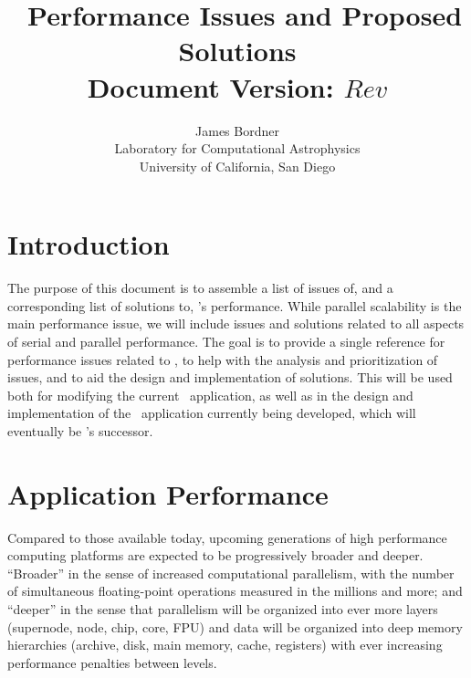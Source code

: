 \documentclass{article}
\begin{document}
\title{ {\huge \enzo\ Performance Issues and Proposed Solutions}  \\ \vspace{0.1in}
     \vspace{-0.1in} {\small Document Version: $Rev$ }}
\author{ James Bordner \\
        Laboratory for Computational Astrophysics\\
        University of California, San Diego}
\maketitle

\section{Introduction}

The purpose of this document is to assemble a list of issues of, and a
corresponding list of solutions to, \enzo's performance.  While
parallel scalability is the main performance issue, we will include
issues and solutions related to all aspects of serial and parallel
performance.  The goal is to provide a single reference for
performance issues related to \enzo, to help with the analysis and
prioritization of issues, and to aid the design and implementation of
solutions.  This will be used both for modifying the current \enzo\
application, as well as in the design and implementation of the
\cello\ application currently being developed, which will eventually
be \enzo's successor.

\section{Application Performance}

Compared to those available today, upcoming generations of high
performance computing platforms are expected to be progressively
broader and deeper.  ``Broader'' in the sense of increased
computational parallelism, with the number of simultaneous
floating-point operations measured in the millions and more; and
``deeper'' in the sense that parallelism will be organized into ever
more layers (supernode, node, chip, core, FPU) and data will be
organized into deep memory hierarchies (archive, disk, main memory,
cache, registers) with ever increasing performance penalties between
levels.
\end{document}
